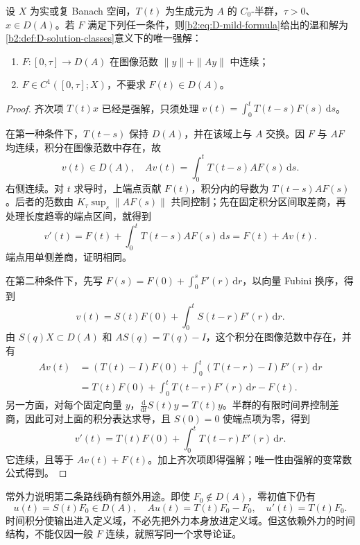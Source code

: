 \begin{theorem}[温和解提升为强解]
\label{b2:thm:D-classical-regularity}
设 \(X\) 为实或复 Banach 空间，\(T(t)\) 为生成元为 \(A\) 的 \(C_0\)-半群，\(\tau>0\)、\(x\in D(A)\)。若 \(F\) 满足下列任一条件，则\eqref{b2:eq:D-mild-formula}给出的温和解为\cref{b2:def:D-solution-classes}意义下的唯一强解：
\begin{enumerate}
 \item \(F:[0,\tau]\to D(A)\) 在图像范数 \(\|y\|+\|Ay\|\) 中连续；
 \item \(F\in C^1([0,\tau];X)\)，不要求 \(F(t)\in D(A)\)。
\end{enumerate}
\end{theorem}
\begin{proof}
齐次项 \(T(t)x\) 已经是强解，只须处理
\(v(t)=\int_0^tT(t-s)F(s)\,\mathrm ds\)。

在第一种条件下，\(T(t-s)\) 保持 \(D(A)\)，并在该域上与 \(A\) 交换。因 \(F\) 与 \(AF\) 均连续，积分在图像范数中存在，故
\[
 v(t)\in D(A),\quad Av(t)=\int_0^tT(t-s)AF(s)\,\mathrm ds.
\]
右侧连续。对 \(t\) 求导时，上端点贡献 \(F(t)\)，积分内的导数为 \(T(t-s)AF(s)\)。后者的范数由 \(K_\tau\sup_s\|AF(s)\|\) 共同控制；先在固定积分区间取差商，再处理长度趋零的端点区间，就得到
\[
 v'(t)=F(t)+\int_0^tT(t-s)AF(s)\,\mathrm ds=F(t)+Av(t).
\]
端点用单侧差商，证明相同。

在第二种条件下，先写
\(F(s)=F(0)+\int_0^sF'(r)\,\mathrm dr\)，以向量 Fubini 换序，得到
\[
 v(t)=S(t)F(0)+\int_0^tS(t-r)F'(r)\,\mathrm dr.
\]
由 \(S(q)X\subset D(A)\) 和 \(AS(q)=T(q)-I\)，这个积分在图像范数中存在，并有
\[
 \begin{aligned}
 Av(t)
 &=(T(t)-I)F(0)+\int_0^t(T(t-r)-I)F'(r)\,\mathrm dr\\
 &=T(t)F(0)+\int_0^tT(t-r)F'(r)\,\mathrm dr-F(t).
 \end{aligned}
\]
另一方面，对每个固定向量 \(y\)，\(\frac{\mathrm d}{\mathrm dt}S(t)y=T(t)y\)。半群的有限时间界控制差商，因此可对上面的积分表达求导，且 \(S(0)=0\) 使端点项为零，得到
\[
 v'(t)=T(t)F(0)+\int_0^tT(t-r)F'(r)\,\mathrm dr.
\]
它连续，且等于 \(Av(t)+F(t)\)。加上齐次项即得强解；唯一性由强解的变常数公式得到。
\end{proof}

常外力说明第二条路线确有额外用途。即使 \(F_0\notin D(A)\)，零初值下仍有
\[
 u(t)=S(t)F_0\in D(A),\quad
 Au(t)=T(t)F_0-F_0,\quad u'(t)=T(t)F_0.
\]
时间积分使输出进入定义域，不必先把外力本身放进定义域。但这依赖外力的时间结构，不能仅因一般 \(F\) 连续，就照写同一个求导论证。

